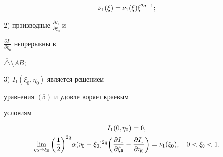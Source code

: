 \begin{lem}
\begin{gather}
%


\overline\nu_1(\xi)=\nu_1(\xi) \xi^{2q-1};\notag


\end{gather}





$2)$ производные ${\frac{\partial I_1}{\partial \xi_0 }}$  и 


${\frac{\partial I_1}{\partial \eta_0 }}$ непрерывны в 


$\overline\triangle\setminus\overline{AB};$





$3)$ $I_1(\xi_0,\eta_0)$ является решением 


уравнения $(5)$ и удовлетворяет краевым


условиям


\begin{gather}


I_1(0,\eta_0)=0,\notag \\


%


\lim_{\eta_0\to \xi_0} \bigg(\frac{1}{2}\bigg)^{2q}\alpha


(\eta_0-\xi_0)^{2q} \bigg(\frac{\partial I_1}{\partial \xi_0 } -


\frac{\partial I_1}{\partial \eta_0 }\bigg) = \nu_1(\xi_0),


\quad 0<\xi_0<1.


\end{gather}


\end{lem}





